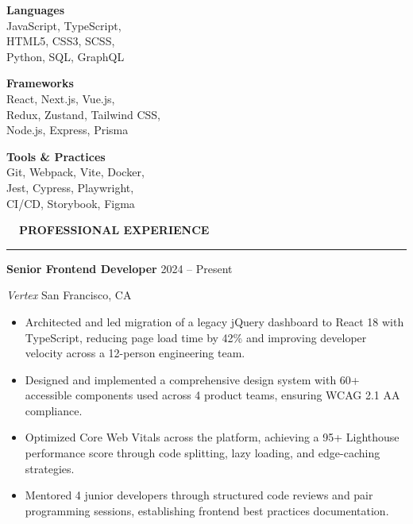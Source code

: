 \documentclass[11pt,a4paper]{article}
\begin{document}
\begin{tcolorbox}[
  colback=bglight,
  colframe=bglight,
  width=\textwidth,
  arc=2pt,
  outer arc=2pt,
  boxrule=0pt,
  left=10pt,
  right=10pt,
  top=10pt,
  bottom=10pt,
  before skip=0pt,
  after skip=0pt
]
\begin{minipage}[t]{0.32\textwidth}
{\bfseries\color{accent}Languages}\\[3pt]
JavaScript, TypeScript,\\
HTML5, CSS3, SCSS,\\
Python, SQL, GraphQL
\end{minipage}%
\hfill%
\begin{minipage}[t]{0.32\textwidth}
{\bfseries\color{accent}Frameworks}\\[3pt]
React, Next.js, Vue.js,\\
Redux, Zustand, Tailwind CSS,\\
Node.js, Express, Prisma
\end{minipage}%
\hfill%
\begin{minipage}[t]{0.32\textwidth}
{\bfseries\color{accent}Tools \& Practices}\\[3pt]
Git, Webpack, Vite, Docker,\\
Jest, Cypress, Playwright,\\
CI/CD, Storybook, Figma
\end{minipage}
\par
\end{tcolorbox}

\vspace{12pt}

{\large\bfseries\color{primary}\faBriefcase\ \ PROFESSIONAL EXPERIENCE}\par
\vspace{2pt}
{\color{accent}\rule{\textwidth}{1.2pt}}\par
\vspace{8pt}

{\bfseries Senior Frontend Developer} \hfill {\color{secondary}2024 -- Present}
\par
{\itshape Vertex} \textbar{} San Francisco, CA
\begin{itemize}
  \item Architected and led migration of a legacy jQuery dashboard to React 18 with TypeScript, reducing page load time by 42\% and improving developer velocity across a 12-person engineering team.
  \item Designed and implemented a comprehensive design system with 60+ accessible components used across 4 product teams, ensuring WCAG 2.1 AA compliance.
  \item Optimized Core Web Vitals across the platform, achieving a 95+ Lighthouse performance score through code splitting, lazy loading, and edge-caching strategies.
  \item Mentored 4 junior developers through structured code reviews and pair programming sessions, establishing frontend best practices documentation.
\end{itemize}
\end{document}
